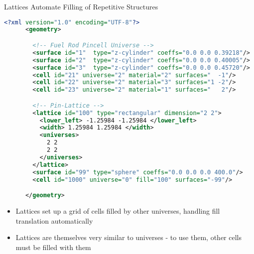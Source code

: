 \begin{frame}[fragile]{Lattices Automate Filling of Repetitive Structures}

  \begin{scriptsize}
    \begin{lstlisting}[language=XML,gobble=4]
      <?xml version="1.0" encoding="UTF-8"?>
      <geometry>

        <!-- Fuel Rod Pincell Universe -->
        <surface id="1"  type="z-cylinder" coeffs="0.0 0.0 0.39218"/>     <!-- fuel OR   -->
        <surface id="2"  type="z-cylinder" coeffs="0.0 0.0 0.40005"/>     <!-- gap OR    -->
        <surface id="3"  type="z-cylinder" coeffs="0.0 0.0 0.45720"/>     <!-- clad OR   -->
        <cell id="21" universe="2" material="2" surfaces="  -1"/>         <!-- fuel  -->
        <cell id="22" universe="2" material="3" surfaces="1 -2"/>         <!-- clad  -->
        <cell id="23" universe="2" material="1" surfaces="   2"/>         <!-- water -->

        <!-- Pin-Lattice -->
        <lattice id="100" type="rectangular" dimension="2 2">
          <lower_left> -1.25984 -1.25984 </lower_left>
          <width> 1.25984 1.25984 </width>
          <universes>
            2 2
            2 2
          </universes>
        </lattice>
        <surface id="99" type="sphere" coeffs="0.0 0.0 0.0 400.0"/>
        <cell id="1000" universe="0" fill="100" surfaces="-99"/>

      </geometry>
    \end{lstlisting}
  \end{scriptsize}


  \begin{itemize}
    \item \small Lattices set up a grid of cells filled by other universes, handling
    fill translation automatically
    \item \small Lattices are themselves very similar to universes - to use them, other
    cells must be filled with them
  \end{itemize}
  
  
  

\end{frame}
